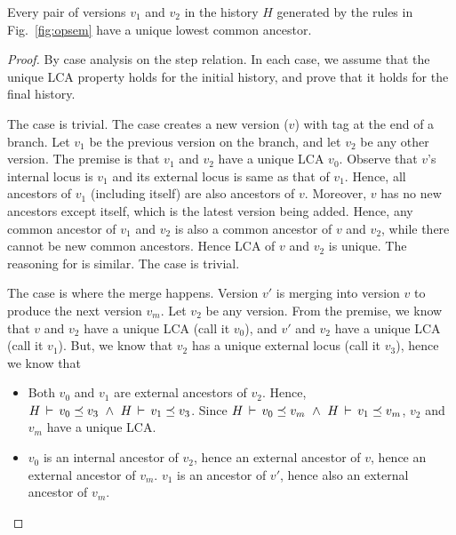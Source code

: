 \begin{lemma} 
Every pair of versions $v_1$ and $v_2$ in the history $H$ generated by
the rules in Fig.~\ref{fig:opsem} have a unique lowest
common ancestor.
\end{lemma}
\begin{proof}
By case analysis on the step relation. In each case, we assume that
the unique LCA property holds for the initial history, and prove that
it holds for the final history.

The  case is trivial. The  case
creates a new version ($v$) with  tag at the end of a branch.
Let $v_1$ be the previous version on the branch, and let $v_2$ be any
other version. The premise is that $v_1$ and $v_2$ have a unique LCA
$v_0$. Observe that $v$'s internal locus is $v_1$ and its external
locus is same as that of $v_1$. Hence, all ancestors of $v_1$
(including itself) are also ancestors of $v$. Moreover, $v$ has no new
ancestors except itself, which is the latest version being added.
Hence, any common ancestor of $v_1$ and $v_2$ is also a common
ancestor of $v$ and $v_2$, while there cannot be new common ancestors.
Hence LCA of $v$ and $v_2$ is unique. The reasoning for
 is similar. The  case is trivial.

The  case is where the merge happens. Version
$v'$ is merging into version $v$ to produce the next version $v_m$.
Let $v_2$ be any version. From the premise, we know that $v$ and $v_2$
have a unique LCA (call it $v_0$), and $v'$ and $v_2$ have a unique
LCA (call it $v_1$). But, we know that $v_2$ has a unique external
locus (call it $v_3$), hence we know that
\begin{itemize}
  \item Both $v_0$ and $v_1$ are external ancestors of $v_2$. Hence,
  $H\,\vdash\,v_0 \preceq v_3 ~\wedge~ H\,\vdash\,v_1 \preceq v_3$.
  Since $H\,\vdash\,v_0 \preceq v_m ~\wedge~ H\,\vdash\,v_1 \preceq v_m$,
  $v_2$ and $v_m$ have a unique LCA.

  \item $v_0$ is an internal ancestor of $v_2$, hence an external
  ancestor of $v$, hence an external ancestor of $v_m$. $v_1$ is
  an ancestor of $v'$, hence also an external ancestor of $v_m$.
\end{itemize}
\end{proof}




